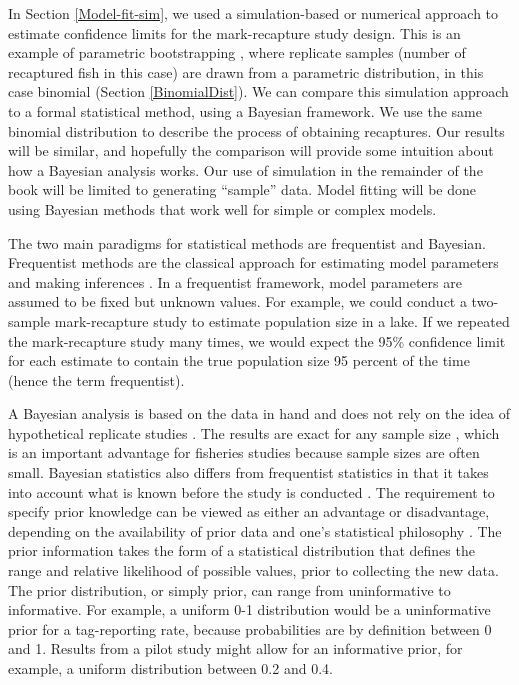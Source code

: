 \documentclass[
]{krantz}
\begin{document}
In Section \ref{Model-fit-sim}, we used a simulation-based or numerical approach to estimate confidence limits for the mark-recapture study design. This is an example of parametric bootstrapping \citep{efron.tibshirani_1993}, where replicate samples (number of recaptured fish in this case) are drawn from a parametric distribution, in this case binomial (Section \ref{BinomialDist}). We can compare this simulation approach to a formal statistical method, using a Bayesian framework. We use the same binomial distribution to describe the process of obtaining recaptures. Our results will be similar, and hopefully the comparison will provide some intuition about how a Bayesian analysis works. Our use of simulation in the remainder of the book will be limited to generating ``sample'' data. Model fitting will be done using Bayesian methods that work well for simple or complex models.

The two main paradigms for statistical methods are frequentist and Bayesian. Frequentist methods are the classical approach for estimating model parameters and making inferences \citep{link.etal_2002, royle.dorazio_2008}. In a frequentist framework, model parameters are assumed to be fixed but unknown values. For example, we could conduct a two-sample mark-recapture study to estimate population size in a lake. If we repeated the mark-recapture study many times, we would expect the 95\% confidence limit for each estimate to contain the true population size 95 percent of the time (hence the term frequentist).

A Bayesian analysis is based on the data in hand and does not rely on the idea of hypothetical replicate studies \citep{mccarthy_2007, royle.dorazio_2008}. The results are exact for any sample size \citep{kéry.schaub_2012}, which is an important advantage for fisheries studies because sample sizes are often small. Bayesian statistics also differs from frequentist statistics in that it takes into account what is known before the study is conducted \citep{mccarthy_2007}. The requirement to specify prior knowledge can be viewed as either an advantage or disadvantage, depending on the availability of prior data and one's statistical philosophy \citep{ellison_2004, mccarthy_2007, kéry_2010, kéry.schaub_2012, dorazio_2016, doll.jacquemin_2018, banner.etal_2020}. The prior information takes the form of a statistical distribution that defines the range and relative likelihood of possible values, prior to collecting the new data. The prior distribution, or simply prior, can range from uninformative to informative. For example, a uniform 0-1 distribution would be a uninformative prior for a tag-reporting rate, because probabilities are by definition between 0 and 1. Results from a pilot study might allow for an informative prior, for example, a uniform distribution between 0.2 and 0.4.
\end{document}
